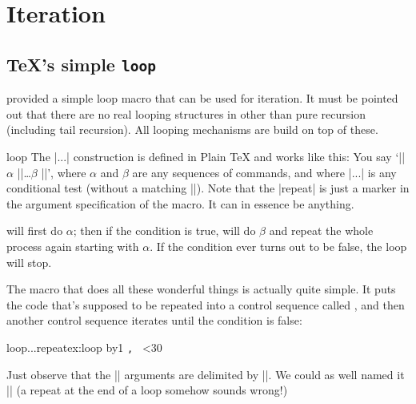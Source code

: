 \chapter{Iteration}

\section{\TeX's simple \protect\texttt{loop}}

 provided a simple loop macro that can be used for iteration. It must be pointed out that there are no real looping structures in \tex other than pure recursion (including tail recursion). All looping mechanisms are build on top of these.

\begin{docCommand}{loop}{}
The |\loop...\repeat| construction is defined in Plain TeX and works like this:
You say `|\loop| $\alpha$ |\if|\dots $\beta$  |\repeat|', where $\alpha$ and $\beta$ are any sequences of
commands, and where |\if...| is any conditional test (without a matching |\fi|). 
Note that the |repeat| is just a marker in the argument specification of the macro. It can in essence be anything.
\end{docCommand}

\tex
will first do $\alpha$; then if the condition is true, \tex will do $\beta$ and repeat the whole process
again starting with $\alpha$. If the condition ever turns out to be false, the loop will stop.


The \cmd{\loop} macro that does all these wonderful things is actually quite simple.
It puts the code that's supposed to be repeated into a control sequence called
\cmd{\body}, and then another control sequence iterates until the condition is false:

\begin{teXXX}
\def\loop#1\repeat{\def\body{#1}\iterate}
\def\iterate{\body\let\next=\iterate\else\let\next=\relax\fi\next}
\end{teXXX}


\begin{texexample}{loop...repeat}{ex:loop}
\newcount\n
{}
\loop
  \advance\n by1
    \texttt{\number\n, } 
  \ifnum\n<30
\repeat
\end{texexample}

Just observe that the |\loop| arguments are delimited by |\repeat|. We could as well named it |\endloop| (a repeat at the end of a loop somehow sounds wrong!)


